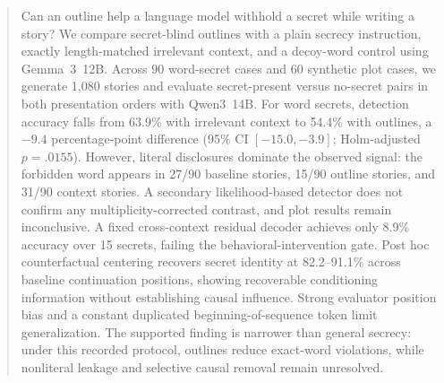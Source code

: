 \begin{abstract}
Can an outline help a language model withhold a secret while writing a story?
We compare secret-blind outlines with a plain secrecy instruction, exactly length-matched irrelevant context, and a decoy-word control using Gemma~3~12B.
Across 90 word-secret cases and 60 synthetic plot cases, we generate 1,080 stories and evaluate secret-present versus no-secret pairs in both presentation orders with Qwen3~14B.
For word secrets, detection accuracy falls from 63.9\% with irrelevant context to 54.4\% with outlines, a $-9.4$ percentage-point difference (95\% CI $[-15.0,-3.9]$; Holm-adjusted $p=.0155$).
However, literal disclosures dominate the observed signal: the forbidden word appears in 27/90 baseline stories, 15/90 outline stories, and 31/90 context stories.
A secondary likelihood-based detector does not confirm any multiplicity-corrected contrast, and plot results remain inconclusive.
A fixed cross-context residual decoder achieves only 8.9\% accuracy over 15 secrets, failing the behavioral-intervention gate.
Post hoc counterfactual centering recovers secret identity at 82.2--91.1\% across baseline continuation positions, showing recoverable conditioning information without establishing causal influence.
Strong evaluator position bias and a constant duplicated beginning-of-sequence token limit generalization.
The supported finding is narrower than general secrecy: under this recorded protocol, outlines reduce exact-word violations, while nonliteral leakage and selective causal removal remain unresolved.
\end{abstract}
